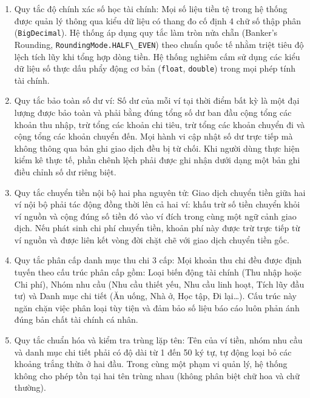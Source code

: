 \documentclass[a4paper,12pt]{report}
\newcommand{\passthrough}[1]{#1}
\begin{document}
\begin{enumerate}
\def\labelenumi{\arabic{enumi}.}
\item
  Quy tắc độ chính xác số học tài chính: Mọi số liệu tiền tệ trong hệ
  thống được quản lý thông qua kiểu dữ liệu có thang đo cố định 4 chữ số
  thập phân (\passthrough{\lstinline!BigDecimal!}). Hệ thống áp dụng quy
  tắc làm tròn nửa chẵn (Banker's Rounding,
  \passthrough{\lstinline!RoundingMode.HALF\_EVEN!}) theo chuẩn quốc tế
  nhằm triệt tiêu độ lệch tích lũy khi tổng hợp dòng tiền. Hệ thống
  nghiêm cấm sử dụng các kiểu dữ liệu số thực dấu phẩy động cơ bản
  (\passthrough{\lstinline!float!}, \passthrough{\lstinline!double!})
  trong mọi phép tính tài chính.
\item
  Quy tắc bảo toàn số dư ví: Số dư của mỗi ví tại thời điểm bất kỳ là
  một đại lượng được bảo toàn và phải bằng đúng tổng số dư ban đầu cộng
  tổng các khoản thu nhập, trừ tổng các khoản chi tiêu, trừ tổng các
  khoản chuyển đi và cộng tổng các khoản chuyển đến. Mọi hành vi cập
  nhật số dư trực tiếp mà không thông qua bản ghi giao dịch đều bị từ
  chối. Khi người dùng thực hiện kiểm kê thực tế, phần chênh lệch phải
  được ghi nhận dưới dạng một bản ghi điều chỉnh số dư riêng biệt.
\item
  Quy tắc chuyển tiền nội bộ hai pha nguyên tử: Giao dịch chuyển tiền
  giữa hai ví nội bộ phải tác động đồng thời lên cả hai ví: khấu trừ số
  tiền chuyển khỏi ví nguồn và cộng đúng số tiền đó vào ví đích trong
  cùng một ngữ cảnh giao dịch. Nếu phát sinh chi phí chuyển tiền, khoản
  phí này được trừ trực tiếp từ ví nguồn và được liên kết vòng đời chặt
  chẽ với giao dịch chuyển tiền gốc.
\item
  Quy tắc phân cấp danh mục thu chi 3 cấp: Mọi khoản thu chi đều được
  định tuyến theo cấu trúc phân cấp gồm: Loại biến động tài chính (Thu
  nhập hoặc Chi phí), Nhóm nhu cầu (Nhu cầu thiết yếu, Nhu cầu linh
  hoạt, Tích lũy đầu tư) và Danh mục chi tiết (Ăn uống, Nhà ở, Học tập,
  Đi lại\ldots). Cấu trúc này ngăn chặn việc phân loại tùy tiện và đảm
  bảo số liệu báo cáo luôn phản ánh đúng bản chất tài chính cá nhân.
\item
  Quy tắc chuẩn hóa và kiểm tra trùng lặp tên: Tên của ví tiền, nhóm nhu
  cầu và danh mục chi tiết phải có độ dài từ 1 đến 50 ký tự, tự động
  loại bỏ các khoảng trắng thừa ở hai đầu. Trong cùng một phạm vi quản
  lý, hệ thống không cho phép tồn tại hai tên trùng nhau (không phân
  biệt chữ hoa và chữ thường).
\end{enumerate}
\end{document}
